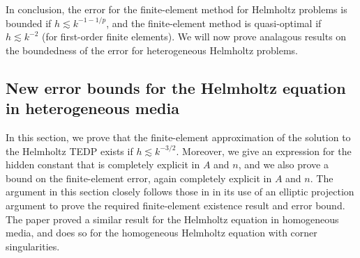 In conclusion, the error for the finite-element method for Helmholtz problems is bounded if $h \lesssim k^{-1-1/p}$, and the finite-element method is quasi-optimal if $h \lesssim k^{-2}$ (for first-order finite elements). We will now prove analagous results on the boundedness of the error for heterogeneous Helmholtz problems.




\subsection{New error bounds for the Helmholtz equation in heterogeneous media}\label{sec:heterr}
In this section, we prove that the finite-element approximation of the solution to the Helmholtz TEDP exists if $ h \lesssim k^{-3/2}.$ Moreover, we give an expression for the hidden constant that is completely explicit in $A$ and $n$, and we also prove a bound on the finite-element error, again completely explicit in $A$ and $n$. The argument in this section closely follows those in \cite{FeWu:11,ChNi:18} in its use of an elliptic projection argument to prove the required finite-element existence result and error bound. The paper \cite{FeWu:11} proved a similar result for the Helmholtz equation in homogeneous media, and \cite{ChNi:18} does so for the homogeneous Helmholtz equation with corner singularities.

